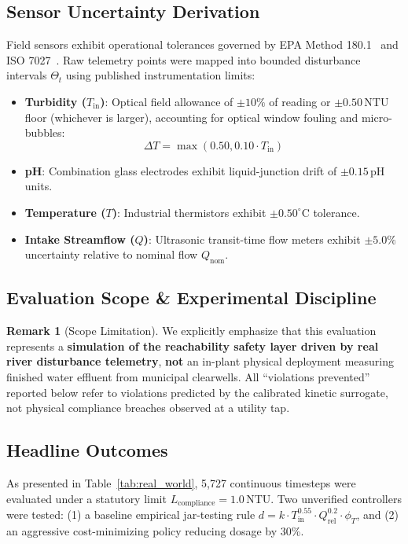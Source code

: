 \documentclass[10pt,twocolumn,letterpaper]{article}
\theoremstyle{definition}
\newtheorem{remark}{Remark}
\newcommand{\Tin}{T_{\text{in}}}
\newcommand{\Qnom}{Q_{\text{nom}}}
\newcommand{\phiT}{\phi_T}
\newcommand{\Lcomp}{L_{\text{compliance}}}
\begin{document}
\subsection{Sensor Uncertainty Derivation}
Field sensors exhibit operational tolerances governed by EPA Method 180.1~\cite{epa1993method180} and ISO 7027~\cite{iso1999water}. Raw telemetry points were mapped into bounded disturbance intervals $\Theta_t$ using published instrumentation limits:
\begin{itemize}
    \item \textbf{Turbidity ($\Tin$)}: Optical field allowance of $\pm 10\%$ of reading or $\pm 0.50\,\text{NTU}$ floor (whichever is larger), accounting for optical window fouling and micro-bubbles:
    \begin{equation}
    \Delta T = \max(0.50, 0.10 \cdot \Tin)
    \end{equation}
    \item \textbf{pH}: Combination glass electrodes exhibit liquid-junction drift of $\pm 0.15\,\text{pH}$ units.
    \item \textbf{Temperature ($T$)}: Industrial thermistors exhibit $\pm 0.50^\circ\text{C}$ tolerance.
    \item \textbf{Intake Streamflow ($Q$)}: Ultrasonic transit-time flow meters exhibit $\pm 5.0\%$ uncertainty relative to nominal flow $\Qnom$.
\end{itemize}

\subsection{Evaluation Scope \& Experimental Discipline}
\begin{remark}[Scope Limitation]
We explicitly emphasize that this evaluation represents a \textbf{simulation of the reachability safety layer driven by real river disturbance telemetry}, \textbf{not} an in-plant physical deployment measuring finished water effluent from municipal clearwells. All ``violations prevented'' reported below refer to violations predicted by the calibrated kinetic surrogate, not physical compliance breaches observed at a utility tap.
\end{remark}

\subsection{Headline Outcomes}
As presented in Table~\ref{tab:real_world}, 5,727 continuous timesteps were evaluated under a statutory limit $\Lcomp = 1.0\,\text{NTU}$. Two unverified controllers were tested: (1) a baseline empirical jar-testing rule $d = k \cdot \Tin^{0.55} \cdot Q_{\text{rel}}^{0.2} \cdot \phiT$, and (2) an aggressive cost-minimizing policy reducing dosage by 30\%.
\end{document}
